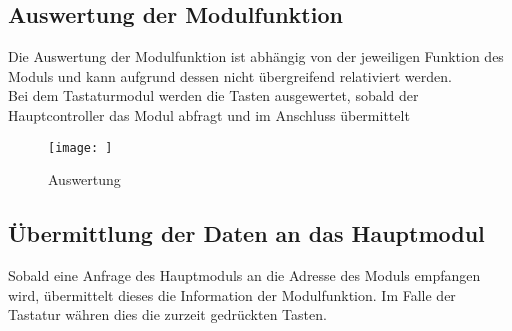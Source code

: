 \subsection{Auswertung der Modulfunktion}
\textmd{Die Auswertung der Modulfunktion ist abhängig von der jeweiligen Funktion des Moduls und kann aufgrund dessen nicht übergreifend relativiert werden.\\
Bei dem Tastaturmodul werden die Tasten ausgewertet, sobald der Hauptcontroller das Modul abfragt und im Anschluss übermittelt
}
\begin{figure}[H]
    \centering    
    \texttt{[image: ]}
    \caption{Auswertung}
    \label{auswertung()}
\end{figure}

\subsection{Übermittlung der Daten an das Hauptmodul}
\textmd{Sobald eine Anfrage des Hauptmoduls an die Adresse des Moduls empfangen wird, übermittelt dieses die Information der Modulfunktion. Im Falle der Tastatur währen dies die zurzeit gedrückten Tasten.}



